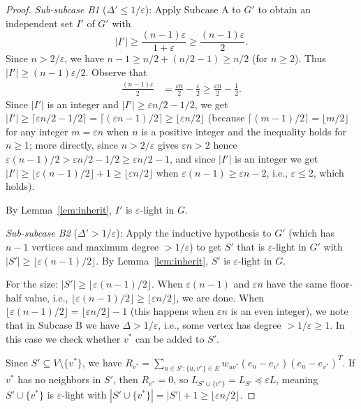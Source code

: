 \documentclass[12pt]{article}
\theoremstyle{definition}
\begin{document}
\begin{proof}
\emph{Sub-subcase B1} ($\Delta' \leq 1/\varepsilon$): Apply Subcase A to $G'$ to obtain an independent set $I'$ of $G'$ with
\[
|I'| \geq \frac{(n-1)\varepsilon}{1+\varepsilon} \geq \frac{(n-1)\varepsilon}{2}.
\]
Since $n > 2/\varepsilon$, we have $n-1 \geq n/2 + (n/2 - 1) \geq n/2$ (for $n \geq 2$). Thus $|I'| \geq (n-1)\varepsilon/2$. Observe that
\begin{align}
\frac{(n-1)\varepsilon}{2} &= \frac{\varepsilon n}{2} - \frac{\varepsilon}{2} \geq \frac{\varepsilon n}{2} - \frac{1}{2}. \label{eq:nearbound}
\end{align}
Since $|I'|$ is an integer and $|I'| \geq \varepsilon n/2 - 1/2$, we get $|I'| \geq \lceil \varepsilon n/2 - 1/2\rceil = \lceil (\varepsilon n - 1)/2\rceil \geq \lfloor \varepsilon n/2 \rfloor$ (because $\lceil(m-1)/2\rceil = \lfloor m/2\rfloor$ for any integer $m = \varepsilon n$ when $n$ is a positive integer and the inequality holds for $n \geq 1$; more directly, since $n > 2/\varepsilon$ gives $\varepsilon n > 2$ hence $\varepsilon(n-1)/2 > \varepsilon n/2 - 1/2 \geq \varepsilon n/2 - 1$, and since $|I'|$ is an integer we get $|I'| \geq \lfloor \varepsilon(n-1)/2\rfloor + 1 \geq \lfloor \varepsilon n/2\rfloor$ when $\varepsilon(n-1) \geq \varepsilon n - 2$, i.e., $\varepsilon \leq 2$, which holds).

By Lemma~\ref{lem:inherit}, $I'$ is $\varepsilon$-light in $G$.

\emph{Sub-subcase B2} ($\Delta' > 1/\varepsilon$): Apply the inductive hypothesis to $G'$ (which has $n-1$ vertices and maximum degree $> 1/\varepsilon$) to get $S'$ that is $\varepsilon$-light in $G'$ with $|S'| \geq \lfloor \varepsilon(n-1)/2\rfloor$. By Lemma~\ref{lem:inherit}, $S'$ is $\varepsilon$-light in $G$.

For the size: $|S'| \geq \lfloor \varepsilon(n-1)/2\rfloor$. When $\varepsilon(n-1)$ and $\varepsilon n$ have the same floor-half value, i.e., $\lfloor \varepsilon(n-1)/2\rfloor \geq \lfloor \varepsilon n/2\rfloor$, we are done. When $\lfloor\varepsilon(n-1)/2\rfloor = \lfloor\varepsilon n/2\rfloor - 1$ (this happens when $\varepsilon n$ is an even integer), we note that in Subcase B we have $\Delta > 1/\varepsilon$, i.e., some vertex has degree $> 1/\varepsilon \geq 1$. In this case we check whether $v^*$ can be added to $S'$.

Since $S' \subseteq V \setminus \{v^*\}$, we have $R_{v^*} = \sum_{u \in S' : \{u,v^*\} \in E} w_{uv^*}(e_u - e_{v^*})(e_u - e_{v^*})^T$. If $v^*$ has no neighbors in $S'$, then $R_{v^*} = 0$, so $L_{S' \cup \{v^*\}} = L_{S'} \preceq \varepsilon L$, meaning $S' \cup \{v^*\}$ is $\varepsilon$-light with $|S' \cup \{v^*\}| = |S'| + 1 \geq \lfloor \varepsilon n/2\rfloor$.


\end{proof}
\end{document}
